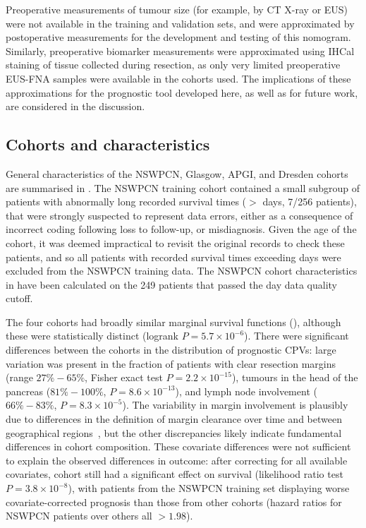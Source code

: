 \documentclass[dissertation.tex]{subfiles}
\begin{document}
Preoperative measurements of tumour size (for example, by \gls{CT} X-ray or \gls{EUS}) were not available in the training and validation sets, and were approximated by postoperative measurements for the development and testing of this nomogram.  Similarly, preoperative biomarker measurements were approximated using \gls{IHCal} staining of tissue collected during resection, as only very limited preoperative \gls{EUS}-\gls{FNA} samples were available in the cohorts used.  The implications of these approximations for the prognostic tool developed here, as well as for future work, are considered in the discussion.  

\subsection{Cohorts and characteristics}
General characteristics of the \gls{NSWPCN}, Glasgow, \gls{APGI}, and Dresden cohorts are summarised in .  The \gls{NSWPCN} training cohort contained a small subgroup of patients with abnormally long recorded survival times ($>$  days, 7/256 patients), that were strongly suspected to represent data errors, either as a consequence of incorrect coding following loss to follow-up, or misdiagnosis.  Given the age of the cohort, it was deemed impractical to revisit the original records to check these patients, and so all patients with recorded survival times exceeding  days were excluded from the \gls{NSWPCN} training data.  The \gls{NSWPCN} cohort characteristics in  have been calculated on the 249 patients that passed the  day data quality cutoff.

The four cohorts had broadly similar marginal survival functions (), although these were statistically distinct (logrank $P = 5.7 \times 10^{-6}$).  There were significant differences between the cohorts in the distribution of prognostic \glspl{CPV}: large variation was present in the fraction of patients with clear resection margins (range $27\%-65\%$, Fisher exact test $P = 2.2 \times 10^{-15}$), tumours in the head of the pancreas ($81\%-100\%$, $P = 8.6 \times 10^{-13}$), and lymph node involvement ($66\%-83\%$, $P = 8.3 \times 10^{-5}$).  The variability in margin involvement is plausibly due to differences in the definition of margin clearance over time and between geographical regions~\cite{Chang2015}, but the other discrepancies likely indicate fundamental differences in cohort composition.  These covariate differences were not sufficient to explain the observed differences in outcome: after correcting for all available covariates, cohort still had a significant effect on survival (likelihood ratio test $P = 3.8 \times 10^{-8}$), with patients from the \gls{NSWPCN} training set displaying worse covariate-corrected prognosis than those from other cohorts (hazard ratios for \gls{NSWPCN} patients over others all $> 1.98$).
\end{document}
